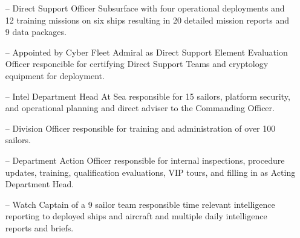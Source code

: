\small{
\begin{itemize}[leftmargin=*]
\item[--] Direct Support Officer Subsurface with four operational deployments and 12 training missions on six ships resulting in 20 detailed mission reports and 9 data packages.
\item[--] Appointed by Cyber Fleet Admiral as Direct Support Element Evaluation Officer responcible for certifying Direct Support Teams and cryptology equipment for deployment.
\item[--] Intel Department Head At Sea responsible for 15 sailors, platform security, and operational planning and direct adviser to the Commanding Officer.
\item[--] Division Officer responsible for training and administration of over 100 sailors.
\item[--] Department Action Officer responsible for internal inspections, procedure updates, training, qualification evaluations, VIP tours, and filling in as Acting Department Head.
\item[--] Watch Captain of a 9 sailor team responsible time relevant intelligence reporting to deployed ships and aircraft and multiple daily intelligence reports and briefs.
\end{itemize}
}

